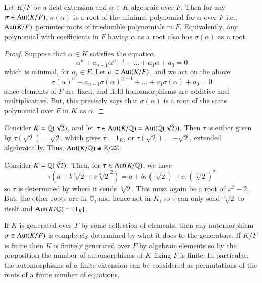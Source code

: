 \begin{prop}
    Let $K/F$ be a field extension and $\alpha \in K$ algebraic over $F$. Then for any $\sigma \in \operatorname{Aut}(K/F)$, $\sigma(\alpha)$ is a root of the minimal polynomial for $\alpha$ over $F$ i.e., $\operatorname{Aut}(K/F)$ permutes roots of irreducible polynomials in $F$. Equivalently, any polynomial with coefficients in $F$ having $\alpha$ as a root also has $\sigma(\alpha)$ as a root.
\end{prop}
\begin{proof}
    Suppose that $\alpha \in K$ satisfies the equation \begin{equation*}
        \alpha^n+a_{n-1}\alpha^{n-1}+...+a_1\alpha+a_0 = 0
    \end{equation*}
    which is minimal, for $a_i \in F$. Let $\sigma \in \operatorname{Aut}(K/F)$, and we act on the above: \begin{equation*}
        \sigma(\alpha)^n + a_{n-1}\sigma(\alpha)^{n-1}+...+a_1\sigma(\alpha)+a_0 = 0
    \end{equation*}
    since elements of $F$ are fixed, and field homomorphisms are additive and multiplicative. But, this precisely says that $\sigma(\alpha)$ is a root of the same polynomial over $F$ in $K$ as $\alpha$.
\end{proof}

\begin{eg}
    Consider $K = \mathbb Q(\sqrt{2})$, and let $\tau \in \operatorname{Aut}(K/\mathbb Q) = \operatorname{Aut}(\mathbb Q(\sqrt{2}))$. Then $\tau$ is either given by $\tau(\sqrt{2}) = \sqrt{2}$, which gives $\tau = 1_K$, or $\tau(\sqrt{2}) = -\sqrt{2}$, extended algebraically. Thus, $\operatorname{Aut}(K/\mathbb Q) \cong \mathbb Z/2\mathbb Z$.
\end{eg}

\begin{eg}
    Consider $K = \mathbb Q(\sqrt[3]{2})$. Then, for $\tau \in \operatorname{Aut}(K/\mathbb Q)$, we have \begin{equation*}
        \tau(a+b\sqrt[3]{2}+c\sqrt[3]{2}^2) = a+b\tau(\sqrt[3]{2})+c\tau(\sqrt[3]{2})^2
    \end{equation*}
    so $\tau$ is determined by where it sends $\sqrt[3]{2}$. This must again be a root of $x^3 - 2$. But, the other roots are in $\mathbb C$, and hence not in $K$, so $\tau$ can only send $\sqrt[3]{2}$ to itself and $\operatorname{Aut}(K/\mathbb Q) = \{1_K\}$.
\end{eg}

If $K$ is generated over $F$ by some collection of elements, then any automorphism $\sigma \in \operatorname{Aut}(K/F)$ is completely determined by what it does to the generators. If $K/F$ is finite then $K$ is finitely generated over $F$ by algebraic elements so by the proposition the number of automorphisms of $K$ fixing $F$ is finite. In particular, the automorphisms of a finite extension can be considered as permutations of the roots of a finite number of equations. 



